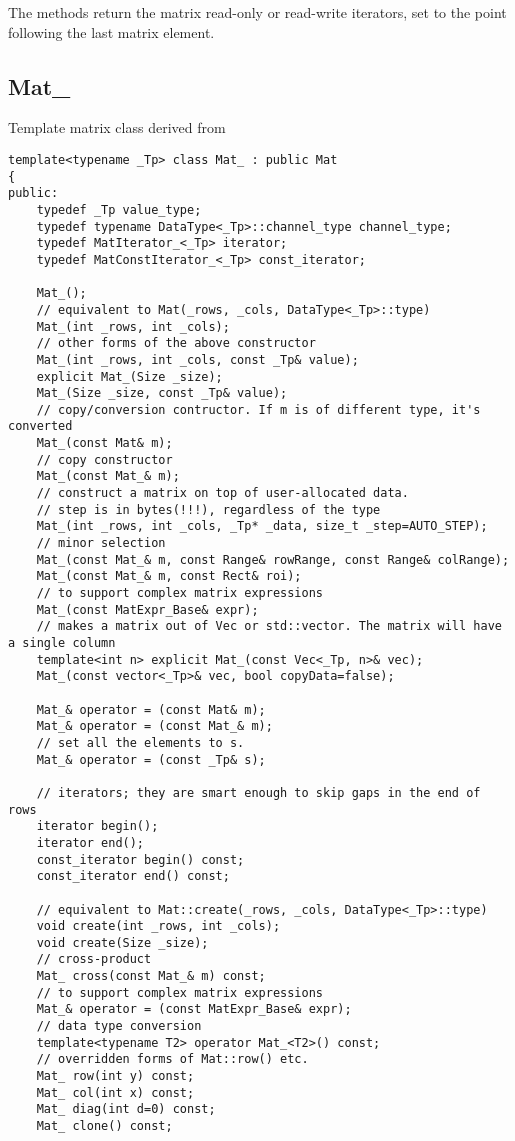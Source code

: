 The methods return the matrix read-only or read-write iterators, set to the point following the last matrix element.


\subsection{Mat\_}\label{MatT}
Template matrix class derived from 

\begin{lstlisting}
template<typename _Tp> class Mat_ : public Mat
{
public:
    typedef _Tp value_type;
    typedef typename DataType<_Tp>::channel_type channel_type;
    typedef MatIterator_<_Tp> iterator;
    typedef MatConstIterator_<_Tp> const_iterator;

    Mat_();
    // equivalent to Mat(_rows, _cols, DataType<_Tp>::type)
    Mat_(int _rows, int _cols);
    // other forms of the above constructor
    Mat_(int _rows, int _cols, const _Tp& value);
    explicit Mat_(Size _size);
    Mat_(Size _size, const _Tp& value);
    // copy/conversion contructor. If m is of different type, it's converted
    Mat_(const Mat& m);
    // copy constructor
    Mat_(const Mat_& m);
    // construct a matrix on top of user-allocated data.
    // step is in bytes(!!!), regardless of the type
    Mat_(int _rows, int _cols, _Tp* _data, size_t _step=AUTO_STEP);
    // minor selection
    Mat_(const Mat_& m, const Range& rowRange, const Range& colRange);
    Mat_(const Mat_& m, const Rect& roi);
    // to support complex matrix expressions
    Mat_(const MatExpr_Base& expr);
    // makes a matrix out of Vec or std::vector. The matrix will have a single column
    template<int n> explicit Mat_(const Vec<_Tp, n>& vec);
    Mat_(const vector<_Tp>& vec, bool copyData=false);

    Mat_& operator = (const Mat& m);
    Mat_& operator = (const Mat_& m);
    // set all the elements to s.
    Mat_& operator = (const _Tp& s);

    // iterators; they are smart enough to skip gaps in the end of rows
    iterator begin();
    iterator end();
    const_iterator begin() const;
    const_iterator end() const;

    // equivalent to Mat::create(_rows, _cols, DataType<_Tp>::type)
    void create(int _rows, int _cols);
    void create(Size _size);
    // cross-product
    Mat_ cross(const Mat_& m) const;
    // to support complex matrix expressions
    Mat_& operator = (const MatExpr_Base& expr);
    // data type conversion
    template<typename T2> operator Mat_<T2>() const;
    // overridden forms of Mat::row() etc.
    Mat_ row(int y) const;
    Mat_ col(int x) const;
    Mat_ diag(int d=0) const;
    Mat_ clone() const;


\end{lstlisting}
